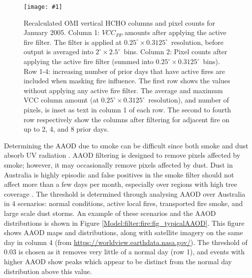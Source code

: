\documentclass[acp, manuscript]{copernicus}
\newcommand{\parencite}{\citep}
\newcommand{\textcite}{\citet}
\newcommand{\degr}{$^{\circ}$}
\newcommand{\lowhr}{$2^{\circ} \times 2.5^{\circ}$}
\newcommand{\highhr}{$0.25^{\circ} \times 0.3125^{\circ}$}
\newcommand{\mypic}[3]{%
  \begin{figure}
    \texttt{[image: \#1]}
    \caption{#2}
    #3
  \end{figure}
}
\begin{document}
    \mypic{Figures/VCC_fires_200501.png}{%
      Recalculated OMI vertical HCHO columns and pixel counts for January 2005.
      Column 1: $VCC_{PP}$ amounts after applying the active fire filter.
      The filter is applied at \highhr ~resolution, before output is averaged into \lowhr ~bins.
      Column 2: Pixel counts after applying the active fire filter (summed into \highhr ~bins).
      Row 1-4: increasing number of prior days that have active fires are included when masking fire influence.
      The first row shows the values without applying any active fire filter.
      The average and maximum VCC column amount (at \highhr ~resolution), and number of pixels, is inset as text in column 1 of each row.
      The second to fourth row respectively show the columns after filtering for adjacent fire on up to 2, 4, and 8 prior days.
    }{\label{Model:omiRecalc:fig_VCC_pp_fires}}
    
    
    
    
    
    Determining the AAOD due to smoke can be difficult since both smoke and dust absorb UV radiation \parencite{Ahn2008, Marais2012}.
    AAOD filtering is designed to remove pixels affected by smoke; however, it may occasionally remove pixels affected by dust.
    Dust in Australia is highly episodic and false positives in the smoke filter should not affect more than a few days per month, especially over regions with high tree coverage \parencite{Shao2007}.
    The threshold is determined through analysing AAOD over Australia in 4 scenarios: normal conditions, active local fires, transported fire smoke, and large scale dust storms.
    An example of these scenarios and the AAOD distributions is shown in Figure \ref{Model:filter:fire:fig_typicalAAOD}. 
    This figure shows AAOD maps and distributions, along with satellite imagery on the same day in column 4 (from \url{https://worldview.earthdata.nasa.gov/}).
    The threshold of 0.03 is chosen as it removes very little of a normal day (row 1), and events with higher AAOD show peaks which appear to be distinct from the normal day distribution above this value.
    
\end{document}
